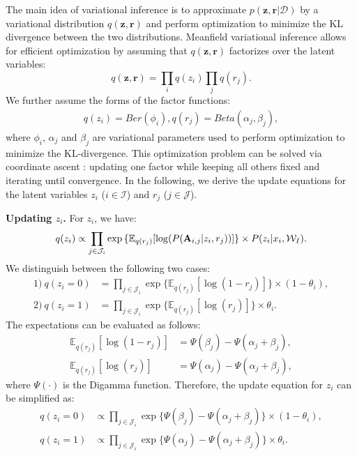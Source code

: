The main idea of variational inference \cite{tzikas2008variational} is to approximate $p(\mathbf{z},\mathbf{r} | \mathcal{D})$ by a variational distribution $q(\mathbf{z},\mathbf{r})$ and perform optimization to minimize the KL divergence between the two distributions. Meanfield variational inference allows for efficient optimization by assuming that $q(\mathbf{z},\mathbf{r})$ factorizes over the latent variables:
\begin{equation}
    q(\mathbf{z},\mathbf{r})=\prod_{i} q(z_i) \prod_j q(r_j).
    \label{eq:dist_fact}
\end{equation}
%
We further assume the forms of the factor functions:
\begin{align}
    q(z_i)=Ber(\phi_i), q(r_j)=Beta(\alpha_j,\beta_j),
\end{align}
%
where $\phi_i$, $\alpha_j$ and $\beta_j$ are variational parameters used to perform optimization to minimize the KL-divergence. This optimization problem can be solved via coordinate ascent \cite{blei2017variational}: updating one factor while keeping all others fixed and iterating until convergence. In the following, we derive the update equations for the latent variables $z_i$ ($i\in\mathcal{I}$) and $r_j$ ($j\in\mathcal{J}$).

\smallskip
\noindent\textbf{Updating $z_i$.} For $z_i$, we have:
%
\begin{equation}
q(z_i)    \propto \prod_{j \in \mathcal{J}_{i}} \exp{\{\mathbb{E}_{q(r_j)}[\log (P(\mathbf{A}_{i,j}|z_i,r_j))]\}}   \times P(z_i|x_i, \mathcal{W}_I). \\
\end{equation}
%
We distinguish between the following two cases:
%
\begin{align}
  1)~ q(z_i=0)   &= \prod_{j \in \mathcal{J}_{i}} \exp{\{\mathbb{E}_{q(r_j)}[\log (1-r_j)]\}}\times (1-\theta_i) \nonumber, \\
  2)~ q(z_i=1)   &= \prod_{j \in \mathcal{J}_{i}} \exp{\{\mathbb{E}_{q(r_j)}[\log (r_j)]\}}\times \theta_i .
\label{eq:q_two_poss}                
\end{align}
%
The expectations can be evaluated as follows:
\begin{align}
    \mathbb{E}_{q(r_j)}[\log (1-r_j)]&= \Psi(\beta_j)-\Psi(\alpha_j+\beta_j), \nonumber \\
    \mathbb{E}_{q(r_j)}[\log (r_j)]&= \Psi(\alpha_j)-\Psi(\alpha_j+\beta_j),
    \label{eq:expect}
\end{align}
where $\Psi(\cdot)$ is the Digamma function. Therefore, the update equation for $z_i$ can be simplified as:
\begin{align}
    q(z_i=0)   &\propto \prod_{j \in \mathcal{J}_{i}} \exp{\{\Psi(\beta_j)-\Psi(\alpha_j+\beta_j)\}}\times (1-\theta_i), \nonumber \\  
     q(z_i=1)    &\propto \prod_{j \in \mathcal{J}_{i}} \exp{\{ \Psi(\alpha_j)-\Psi(\alpha_j+\beta_j)\}}\times \theta_i  .
     \label{eq:qzi}
\end{align}

